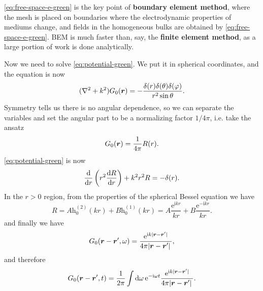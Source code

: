 \documentclass[hyperref, a4paper]{article}
\newcommand*{\ii}{\mathrm{i}}
\newcommand*{\ee}{\mathrm{e}}
\newcommand*{\concept}[1]{{\textbf{#1}}}
\begin{document}
\eqref{eq:free-space-e-green} is the key point of \concept{boundary element method}, where the mesh is placed on boundaries where the electrodynamic properties of mediums change, and fields in the homogeneous bulks are obtained by \eqref{eq:free-space-e-green}.
BEM is much faster than, say, the \concept{finite element method}, as a large portion of work is done analytically.

Now we need to solve \eqref{eq:potential-green}. We put it in spherical coordinates, and the equation is now 
\[
    (\laplacian + k^2) G_0(\vb*{r} ) = - \frac{\delta(r ) \delta(\theta) \delta(\varphi )}{r^2 \sin\theta}.   
\]
Symmetry tells us there is no angular dependence, so we can separate the variables and set the angular part to be a normalizing factor $1 / 4\pi$, i.e. take the ansatz
\[
    G_0(\vb*{r}) = \frac{1}{4\pi} R(r).
\]
\eqref{eq:potential-green} is now 
\[
    \dv{r} \left( r^2 \dv{R}{r} \right) + k^2 r^2 R = - \delta(r).
\]
In the $r > 0$ region, from the properties of the spherical Bessel equation we have 
\[
    R = A \mathrm{h}^{(2)}_0(kr) + B \mathrm{h}^{(1)}_0(kr) = A \frac{\ee^{\ii k r}}{kr} + B \frac{\ee^{- \ii k r}}{kr}.
\]
and finally we have 
\begin{equation}
    G_0(\vb*{r} - \vb*{r}', \omega) = \frac{\ee^{\ii k \abs*{\vb*{r} - \vb*{r}'}}}{4 \pi \abs*{\vb*{r} - \vb*{r}'}},
    \label{eq:scalar-green}
\end{equation}
and therefore 
\begin{equation}
    G_0(\vb*{r} - \vb*{r}', t) = \frac{1}{2\pi} \int \dd{\omega} \ee^{- \ii \omega t}  \frac{\ee^{\ii k \abs*{\vb*{r} - \vb*{r}'}}}{4 \pi \abs*{\vb*{r} - \vb*{r}'}}.
\end{equation}
\end{document}
